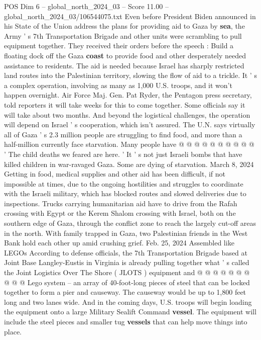 \begin{textsample}{POS Dim 6 – global\_north\_2024\_03 – Score 11.00 – global\_north\_2024\_03/106544075.txt}  \label{ex:f6_pos_052}
Even before President Biden announced in his State of the Union address the plans for providing aid to Gaza by \textbf{sea}, the Army ' s 7th Transportation Brigade and other units were scrambling to pull equipment together.
They received their orders before the speech : Build a floating dock off the Gaza \textbf{coast} to provide food and other desperately needed assistance to residents.
The aid is needed because Israel has sharply restricted land routes into the Palestinian territory, slowing the flow of aid to a trickle.
It ' s a complex operation, involving as many as 1,000 U.S. troops, and it won't happen overnight.
Air Force Maj.
Gen.
Pat Ryder, the Pentagon press secretary, told reporters it will take weeks for this to come together.
Some officials say it will take about two months.
And beyond the logistical challenges, the operation will depend on Israel ' s cooperation, which isn't assured.
The U.N. says virtually all of Gaza ' s 2.3 million people are struggling to find food, and more than a half-million currently face starvation.
Many people have @ @ @ @ @ @ @ @ @ @ ' The child deaths we feared are here. ' It ' s not just Israeli bombs that have killed children in war-ravaged Gaza.
Some are dying of starvation.
March 8, 2024 Getting in food, medical supplies and other aid has been difficult, if not impossible at times, due to the ongoing hostilities and struggles to coordinate with the Israeli military, which has blocked routes and slowed deliveries due to inspections.
Trucks carrying humanitarian aid have to drive from the Rafah crossing with Egypt or the Kerem Shalom crossing with Israel, both on the southern edge of Gaza, through the conflict zone to reach the largely cut-off areas in the north.
With family trapped in Gaza, two Palestinian friends in the West Bank hold each other up amid crushing grief.
Feb. 25, 2024 Assembled like LEGOs According to defense officials, the 7th Transportation Brigade based at Joint Base Langley-Eustis in Virginia is already pulling together what ' s called the Joint Logistics Over The Shore ( JLOTS ) equipment and @ @ @ @ @ @ @ @ @ @ Lego system -- an array of 40-foot-long pieces of steel that can be locked together to form a pier and causeway.
The causeway would be up to 1,800 feet long and two lanes wide.
And in the coming days, U.S. troops will begin loading the equipment onto a large Military Sealift Command \textbf{vessel}.
The equipment will include the steel pieces and smaller tug \textbf{vessels} that can help move things into place.

\end{textsample}
